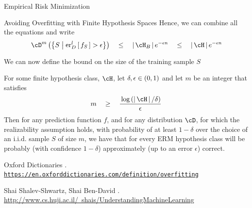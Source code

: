 \documentclass{article}
\begin{document}
\begin{ssection}{Empirical Risk Minimization}
\begin{ssubsection}{Avoiding Overfitting with Finite Hypothesis Spaces}
		Hence, we can combine all the equations and write
		\begin{align*}
			\func{\cD^m}{\set{S \pipe \err[_D^l]{f_S} > \epsilon}}	\qle	\abs{\cH_B} \exp{-\epsilon n}	\qle	\abs{\cH} \exp{-\epsilon n}
		\end{align*} \sbr

		We can now define the bound on the size of the training sample $S$ \br

		\begin{theorem}
			For some finite hypothesis class, $\cH$, let $\delta, \epsilon \in \left( {0, 1} \right)$ and let $m$ be an integer that satisfies
			\begin{align*}
				m	\qge	\frac{\log{\abs{\cH} / \delta}}{\epsilon}
			\end{align*}
			Then for any prediction function $f$, and for any distribution $\cD$, for which the realizability assumption holds, with probability of at least $1 - \delta$ over the choice of an i.i.d. sample $S$ of size $m$, we have that for every ERM hypothesis class will be probably (with confidence $1 - \delta$) approximately (up to an error $\epsilon$) correct.
		\end{theorem}

	\end{ssubsection}

\end{ssection}

\begin{thebibliography}{10}

		Oxford Dictionaries
		. \\
		\href{https://en.oxforddictionaries.com/definition/overfitting}{\tt{https://en.oxforddictionaries.com/definition/overfitting}}

		Shai Shalev-Shwartz, Shai Ben-David
		. \\
		\href{http://www.cs.huji.ac.il/~shais/UnderstandingMachineLearning}{http://www.cs.huji.ac.il/~shais/UnderstandingMachineLearning}

\end{thebibliography}
\end{document}
